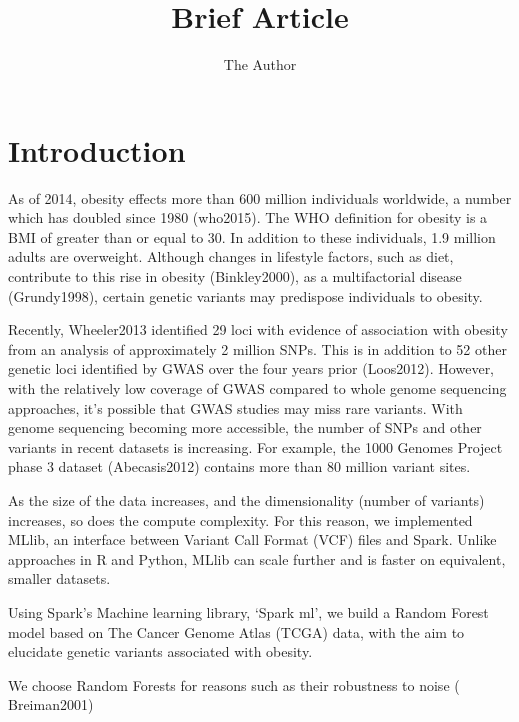 \documentclass[11pt]{amsart}
\title{Brief Article}
\author{The Author}
\begin{document}
\maketitle
\section{Introduction}
As of 2014, obesity effects more than 600 million individuals worldwide, a number which has doubled since 1980 (who2015). The WHO definition for obesity is a BMI of greater than or equal to 30.
In addition to these individuals, 1.9 million adults are overweight.
Although changes in lifestyle factors, such as diet, contribute to this rise in obesity (Binkley2000), as a multifactorial disease (Grundy1998), certain genetic variants may predispose individuals to obesity.

Recently, Wheeler2013 identified 29 loci with evidence of association with obesity from an analysis of approximately 2 million SNPs.
This is in addition to 52 other genetic loci identified by GWAS over the four years prior (Loos2012).
However, with the relatively low coverage of GWAS compared to whole genome sequencing approaches, it's possible that GWAS studies may miss rare variants.
With genome sequencing becoming more accessible, the number of SNPs and other variants in recent datasets is increasing. For example,
the 1000 Genomes Project phase 3 dataset (Abecasis2012) contains more than 80 million variant sites.

As the size of the data increases, and the dimensionality (number of variants) increases, so does the compute complexity.
For this reason, we implemented MLlib, an interface between Variant Call Format (VCF) files and Spark.
Unlike approaches in R and Python, MLlib can scale further and is faster on equivalent, smaller datasets.

Using Spark's Machine learning library, `Spark ml', we build a Random Forest model based on The Cancer Genome Atlas (TCGA) data, with the aim to
elucidate genetic variants associated with obesity.

We choose Random Forests for reasons such as their robustness to noise ( Breiman2001) 









\end{document}
